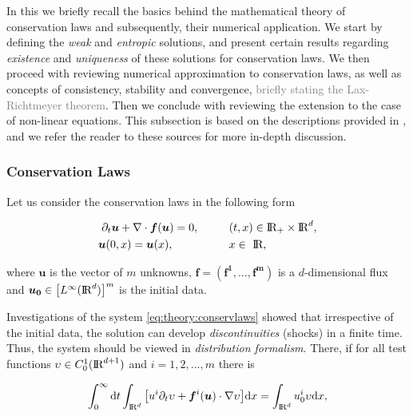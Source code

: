 In this  we briefly recall the basics behind the mathematical theory of conservation laws and subsequently, their numerical application. 
We start by defining the \textit{weak} and \textit{entropic} solutions, and present certain results regarding \textit{existence} and \textit{uniqueness} of these solutions for conservation laws. 
We then proceed with reviewing numerical approximation to conservation laws, as well as concepts of consistency, stability and convergence, \textcolor{gray}{briefly stating the Lax-Richtmeyer theorem}. 
Then we conclude with reviewing the extension to the case of non-linear equations. 
This subsection is based on the descriptions provided in \cite{LeVeque:1992,Tadmor1998}, and we refer the reader to these sources for more in-depth discussion.

\subsubsection{Conservation Laws}


Let us consider the conservation laws in the following form

\begin{align}
\partial_t\boldsymbol{u} + \nabla\cdot\boldsymbol{f}(\boldsymbol{u}) = 0, \hspace{10mm} &(t,x)\in \text{I\!R}_{+}\times\text{I\!R}^d , \\
\boldsymbol{u}(0, x) = \boldsymbol{u}(x), \hspace{18mm} &x\in \text{ I\!R},
\label{eq:theory:conservlaws}
\end{align}

where $\boldsymbol{u}$ is the vector of $m$ unknowns, $\boldsymbol{f}=(\boldsymbol{\boldsymbol{f}^1,...,\boldsymbol{f}^m})$ is a $d$-dimensional flux and $\boldsymbol{u_0}\in\big[L^{\infty}(\text{I\!R}^d)\big]^m$ is the initial data. 

Investigations of the system \ref{eq:theory:conservlaws} showed that irrespective of the initial data, the solution can develop \textit{discontinuities} (shocks) in a finite time. 
Thus, the system should be viewed in \textit{distribution formalism}. 
There, if for all test functions $\upsilon\in C_0 ^1 (\text{I\!R}^{d+1})$ and $i=1,2,...,m$  there is

\begin{equation}
\int_{0}^{\infty}\text{d}t\int_{\text{I\!R}^d}\big[u^i \partial_t\upsilon + \boldsymbol{f}^i(\boldsymbol{u})\cdot\nabla\upsilon\big]\text{d}x = \int_{\text{I\!R}^d} u_0 ^i \upsilon \text{d}x,
\end{equation}

